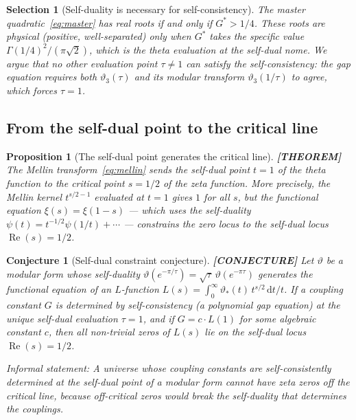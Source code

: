 \documentclass[11pt]{article}
\theoremstyle{tight}
\newtheorem{proposition}[theorem]{Proposition}
\theoremstyle{plainroman}
\newtheorem{selection}[theorem]{Selection}
\newtheorem{conjecture}[theorem]{Conjecture}
\newcommand{\dd}{\,\mathrm{d}}
\begin{document}
\begin{selection}[Self-duality is necessary for self-consistency]\label{sel:necessary}
The master quadratic~\eqref{eq:master} has real roots if and only if $G^*>1/4$.
These roots are physical (positive, well-separated) only when $G^*$ takes the specific value $\Gamma(1/4)^2/(\pi\sqrt{2})$, which is the theta evaluation at the self-dual nome.
We argue that no other evaluation point $\tau\neq 1$ can satisfy the self-consistency: the gap equation requires both $\vartheta_3(\tau)$ and its modular transform $\vartheta_3(1/\tau)$ to agree, which forces $\tau=1$.
\end{selection}

\subsection{From the self-dual point to the critical line}

\begin{proposition}[The self-dual point generates the critical line]\label{prop:generates}
\textbf{[THEOREM]}
The Mellin transform~\eqref{eq:mellin} sends the self-dual point $t=1$ of the theta function to the critical point $s=1/2$ of the zeta function.
More precisely, the Mellin kernel $t^{s/2-1}$ evaluated at $t=1$ gives $1$ for all $s$, but the functional equation $\xi(s)=\xi(1-s)$ --- which \emph{uses} the self-duality $\psi(t)=t^{-1/2}\psi(1/t)+\cdots$ --- constrains the zero locus to the self-dual locus $\operatorname{Re}(s)=1/2$.
\end{proposition}

\begin{conjecture}[Self-dual constraint conjecture]\label{conj:main}
\textbf{[CONJECTURE]}
Let $\vartheta$ be a modular form whose self-duality $\vartheta(e^{-\pi/\tau})=\sqrt{\tau}\,\vartheta(e^{-\pi\tau})$ generates the functional equation of an $L$-function $L(s)=\int_0^\infty\vartheta_*(t)\,t^{s/2}\dd t/t$.
If a coupling constant $G$ is determined by self-consistency (a polynomial gap equation) at the unique self-dual evaluation $\tau=1$, and if $G=c\cdot L(1)$ for some algebraic constant $c$, then all non-trivial zeros of $L(s)$ lie on the self-dual locus $\operatorname{Re}(s)=1/2$.

\emph{Informal statement:} A universe whose coupling constants are self-consistently determined at the self-dual point of a modular form cannot have zeta zeros off the critical line, because off-critical zeros would break the self-duality that determines the couplings.
\end{conjecture}
\end{document}
